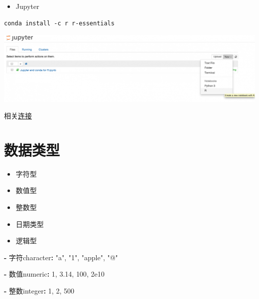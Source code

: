 \documentclass[]{book}
\newenvironment{Shaded}{\begin{snugshade}}{\end{snugshade}}
\newcommand{\DecValTok}[1]{\textcolor[rgb]{0.00,0.00,0.81}{#1}}
\newcommand{\FloatTok}[1]{\textcolor[rgb]{0.00,0.00,0.81}{#1}}
\newcommand{\NormalTok}[1]{#1}
\newcommand{\OperatorTok}[1]{\textcolor[rgb]{0.81,0.36,0.00}{\textbf{#1}}}
\newcommand{\StringTok}[1]{\textcolor[rgb]{0.31,0.60,0.02}{#1}}
\providecommand{\tightlist}{%
  \setlength{\itemsep}{0pt}\setlength{\parskip}{0pt}}
\begin{document}
\begin{itemize}
\tightlist
\item
  Jupyter
\end{itemize}

\begin{verbatim}
conda install -c r r-essentials
\end{verbatim}

\includegraphics{figures/jupyter.png}

相关\href{https://www.anaconda.com/developer-blog/jupyter-and-conda-r/}{连接}

\hypertarget{section-3}{%
\section{数据类型}\label{section-3}}

\begin{itemize}
\tightlist
\item
  字符型
\item
  数值型
\item
  整数型
\item
  日期类型
\item
  逻辑型
\end{itemize}

\begin{Shaded}
\begin{Highlighting}[]
\OperatorTok{-}\StringTok{ }\NormalTok{字符character}\OperatorTok{:}\StringTok{ "a"}\NormalTok{, }\StringTok{"1"}\NormalTok{, }\StringTok{"apple"}\NormalTok{, }\StringTok{"@"}
\end{Highlighting}
\end{Shaded}

\begin{Shaded}
\begin{Highlighting}[]
\OperatorTok{-}\StringTok{ }\NormalTok{数值numeric}\OperatorTok{:}\StringTok{ }\DecValTok{1}\NormalTok{, }\FloatTok{3.14}\NormalTok{, }\DecValTok{100}\NormalTok{, }\FloatTok{2e10}
\end{Highlighting}
\end{Shaded}

\begin{Shaded}
\begin{Highlighting}[]
\OperatorTok{-}\StringTok{ }\NormalTok{整数integer}\OperatorTok{:}\StringTok{ }\DecValTok{1}\NormalTok{, }\DecValTok{2}\NormalTok{, }\DecValTok{500}
\end{Highlighting}
\end{Shaded}
\end{document}
